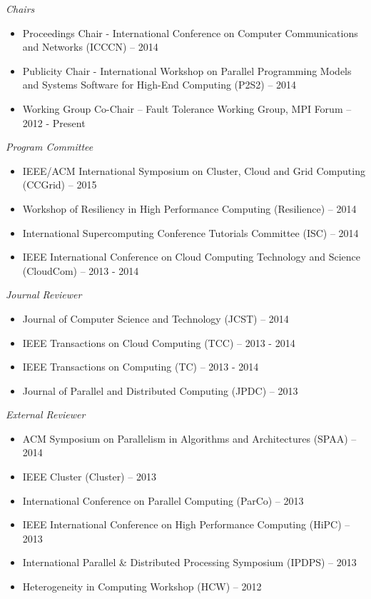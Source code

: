 {\sl Chairs}
\begin{itemize}
    \item Proceedings Chair - International Conference on Computer
        Communications and Networks (ICCCN) -- 2014
    \item Publicity Chair - International Workshop on Parallel Programming
        Models and Systems Software for High-End Computing (P2S2) -- 2014
    \item Working Group Co-Chair -- Fault Tolerance Working Group, MPI Forum -- 2012 - Present
\end{itemize}

{\sl Program Committee}
\begin{itemize}
    \item IEEE/ACM International Symposium on Cluster, Cloud and Grid
        Computing (CCGrid) -- 2015
    \item Workshop of Resiliency in High Performance Computing (Resilience) --
        2014
    \item International Supercomputing Conference Tutorials Committee (ISC) --
        2014
    \item IEEE International Conference on Cloud Computing Technology and
        Science (CloudCom) -- 2013 - 2014
\end{itemize}

{\sl Journal Reviewer}
\begin{itemize}
    \item Journal of Computer Science and Technology (JCST) -- 2014
    \item IEEE Transactions on Cloud Computing (TCC) -- 2013 - 2014
    \item IEEE Transactions on Computing (TC) -- 2013 - 2014
    \item Journal of Parallel and Distributed Computing (JPDC) -- 2013
\end{itemize}

{\sl External Reviewer}
\begin{itemize}
    \item ACM Symposium on Parallelism in Algorithms and Architectures (SPAA) -- 2014
    \item IEEE Cluster (Cluster) -- 2013
    \item International Conference on Parallel Computing (ParCo) -- 2013
    \item IEEE International Conference on High Performance Computing (HiPC) -- 2013
    \item International Parallel \& Distributed Processing Symposium (IPDPS) -- 2013
    \item Heterogeneity in Computing Workshop (HCW) -- 2012
\end{itemize}

